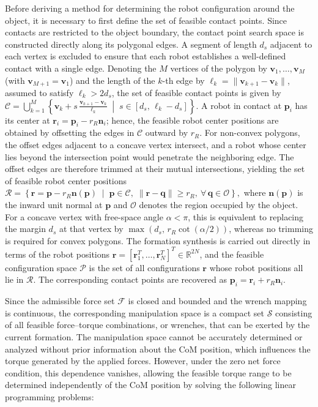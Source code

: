 Before deriving a method for determining the robot configuration around the object, it is necessary to first define the set of feasible contact points. Since contacts are restricted to the object boundary, the contact point search space is constructed directly along its polygonal edges. A segment of length $d_s$ adjacent to each vertex is excluded to ensure that each robot establishes a well-defined contact with a single edge. Denoting the $M$ vertices of the polygon by $\mathbf{v}_1,\ldots,\mathbf{v}_M$ (with $\mathbf{v}_{M+1}=\mathbf{v}_1$) and the length of the $k$-th edge by $\ell_k=\|\mathbf{v}_{k+1}-\mathbf{v}_k\|$, assumed to satisfy $\ell_k>2d_s$, the set of feasible contact points is given by
$
\mathcal{C}
=
\bigcup_{k=1}^{M}
\left\{
\mathbf{v}_k+s\,\frac{\mathbf{v}_{k+1}-\mathbf{v}_k}{\ell_k}
\;\middle|\;
s\in[d_s,\,\ell_k-d_s]
\right\}.
$
A robot in contact at $\mathbf{p}_i$ has its center at $\mathbf{r}_i=\mathbf{p}_i-r_R\mathbf{n}_i$; hence, the feasible robot center positions are obtained by offsetting the edges in $\mathcal{C}$ outward by $r_R$. For non-convex polygons, the offset edges adjacent to a concave vertex intersect, and a robot whose center lies beyond the intersection point would penetrate the neighboring edge. The offset edges are therefore trimmed at their mutual intersections, yielding the set of feasible robot center positions
$
\mathcal{R}
=
\left\{
\mathbf{r}=\mathbf{p}-r_R\mathbf{n}(\mathbf{p})
\;\middle|\;
\mathbf{p}\in\mathcal{C},\;
\|\mathbf{r}-\mathbf{q}\|\geq r_R,\ \forall\,\mathbf{q}\in\mathcal{O}
\right\},
$
where $\mathbf{n}(\mathbf{p})$ is the inward unit normal at $\mathbf{p}$ and $\mathcal{O}$ denotes the region occupied by the object. For a concave vertex with free-space angle $\alpha<\pi$, this is equivalent to replacing the margin $d_s$ at that vertex by $\max\left(d_s,\,r_R\cot(\alpha/2)\right)$, whereas no trimming is required for convex polygons. The formation synthesis is carried out directly in terms of the robot positions $\mathbf{r}=[\mathbf{r}_1^T,\ldots,\mathbf{r}_N^T]^T\in\mathbb{R}^{2N}$, and the feasible configuration space $\mathcal{P}$ is the set of all configurations $\mathbf{r}$ whose robot positions all lie in $\mathcal{R}$. The corresponding contact points are recovered as $\mathbf{p}_i=\mathbf{r}_i+r_R\mathbf{n}_i$.

Since the admissible force set $\mathcal{F}$ is closed and bounded and the wrench mapping is continuous, the corresponding manipulation space is a compact set $\mathcal{S}$ consisting of all feasible force--torque combinations, or wrenches, that can be exerted by the current formation. The manipulation space cannot be accurately determined or analyzed without prior information about the CoM position, which influences the torque generated by the applied forces. However, under the zero net force condition, this dependence vanishes, allowing the feasible torque range to be determined independently of the CoM position by solving the following linear programming problems:

